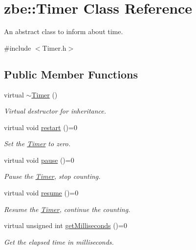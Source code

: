 \hypertarget{classzbe_1_1_timer}{}\section{zbe\+:\+:Timer Class Reference}
\label{classzbe_1_1_timer}


An abstract class to inform about time.  




{\ttfamily \#include $<$Timer.\+h$>$}

\subsection*{Public Member Functions}
\begin{DoxyCompactItemize}
\item 
virtual \hyperlink{classzbe_1_1_timer_a0580e55b28f6dde20240059de12dc1d8}{$\sim$\+Timer} ()
\begin{DoxyCompactList}\small\item\em Virtual destructor for inheritance. \end{DoxyCompactList}\item 
virtual void \hyperlink{classzbe_1_1_timer_a7ce01b37528ade45ab0fd31edfd5be71}{restart} ()=0
\begin{DoxyCompactList}\small\item\em Set the \hyperlink{classzbe_1_1_timer}{Timer} to zero. \end{DoxyCompactList}\item 
virtual void \hyperlink{classzbe_1_1_timer_acaee85b31f4055d1b704f9f033aba06a}{pause} ()=0
\begin{DoxyCompactList}\small\item\em Pause the \hyperlink{classzbe_1_1_timer}{Timer}, stop counting. \end{DoxyCompactList}\item 
virtual void \hyperlink{classzbe_1_1_timer_ae75a4ff2f543df264a8de58b246a9661}{resume} ()=0
\begin{DoxyCompactList}\small\item\em Resume the \hyperlink{classzbe_1_1_timer}{Timer}, continue the counting. \end{DoxyCompactList}\item 
virtual unsigned int \hyperlink{classzbe_1_1_timer_aac4d92010632f3b52253835eed9180eb}{get\+Milliseconds} ()=0
\begin{DoxyCompactList}\small\item\em Get the elapsed time in milliseconds. \end{DoxyCompactList}\end{DoxyCompactItemize}


